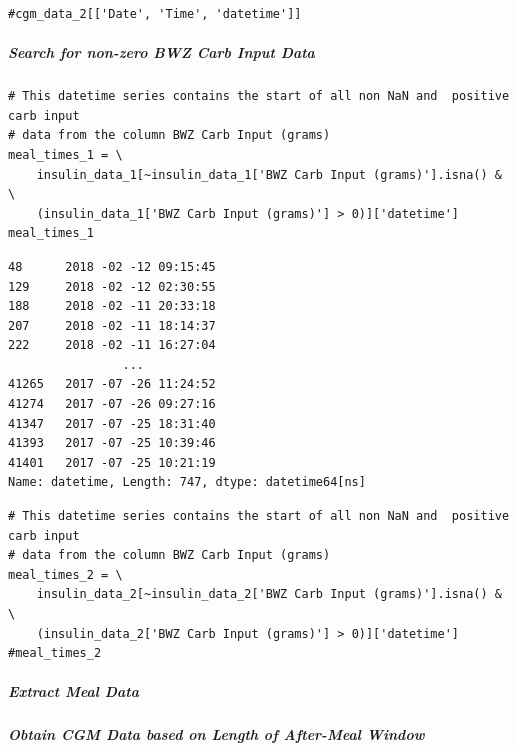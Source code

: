\begin{verbatim}
#cgm_data_2[['Date', 'Time', 'datetime']]
\end{verbatim}

\subparagraph{Search for non-zero BWZ Carb Input Data}

\begin{verbatim}
# This datetime series contains the start of all non NaN and  positive carb input
# data from the column BWZ Carb Input (grams)
meal_times_1 = \
    insulin_data_1[~insulin_data_1['BWZ Carb Input (grams)'].isna() & \
    (insulin_data_1['BWZ Carb Input (grams)'] > 0)]['datetime']
meal_times_1
\end{verbatim}

\begin{verbatim}
48      2018 -02 -12 09:15:45
129     2018 -02 -12 02:30:55
188     2018 -02 -11 20:33:18
207     2018 -02 -11 18:14:37
222     2018 -02 -11 16:27:04
                ...        
41265   2017 -07 -26 11:24:52
41274   2017 -07 -26 09:27:16
41347   2017 -07 -25 18:31:40
41393   2017 -07 -25 10:39:46
41401   2017 -07 -25 10:21:19
Name: datetime, Length: 747, dtype: datetime64[ns]
\end{verbatim}

\begin{verbatim}
# This datetime series contains the start of all non NaN and  positive carb input
# data from the column BWZ Carb Input (grams)
meal_times_2 = \
    insulin_data_2[~insulin_data_2['BWZ Carb Input (grams)'].isna() & \
    (insulin_data_2['BWZ Carb Input (grams)'] > 0)]['datetime']
#meal_times_2
\end{verbatim}

\subparagraph{Extract Meal Data}

\subparagraph{Obtain CGM Data based on Length of After-Meal Window}

